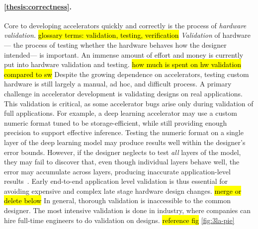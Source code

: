 
\paragraph{
\cref{thesis:correctness}.
}
Core to developing
  accelerators
  quickly and correctly
  is the process of \textit{hardware validation.}
\hl{glossary terms: validation, testing, verification}
\textit{Validation}
  of hardware---%
  the process of testing
  whether the hardware behaves
  how the designer intended---%
  is important.
An immense amount of effort
  and money
  is currently put
  into hardware validation and testing.
\hl{how much is spent on hw validation compared to sw}  
Despite the growing dependence
  on accelerators,
  testing custom hardware is still largely
  a manual, ad hoc, and difficult process.
A primary challenge in 
  accelerator development
  is validating designs
  on real applications.
This validation
  is critical,
  as some accelerator bugs 
  arise
  only during validation
  of full applications.
For example,
  a deep learning
  accelerator may use
  a custom numeric format
  tuned to be storage-efficient,
  while still providing enough
  precision
  to support effective inference.
Testing the numeric format
  on a single layer
  of the deep learning model
  may produce results
  well within the designer's
  error bounds.
However, if the designer
  neglects to test
  \textit{all}
  layers of the model,
  they may fail to discover that,
  even though individual layers
  behave well,
  the error may accumulate
  across layers,
  producing inaccurate application-level results~\cite{zorn2021rounding}.
Early end-to-end application level validation is thus essential
  for avoiding expensive and complex late stage hardware design changes.
\hl{merge or delete below}
In general,
  thorough validation
  is inaccessible
  to the common designer.
The most intensive validation
  is done in industry,
  where companies can hire full-time
  engineers
  to do validation
  on designs.
\hl{reference fig} \cref{fig:3la-pie}

